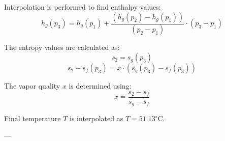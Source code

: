 Interpolation is performed to find enthalpy values:  
\[
h_g(p_3) = h_g(p_1) + \frac{(h_g(p_2) - h_g(p_1))}{(p_2 - p_1)} \cdot (p_3 - p_1)
\]  

The entropy values are calculated as:  
\[
s_2 = s_g(p_3)  
\]  
\[
s_2 - s_f(p_3) = x \cdot (s_g(p_3) - s_f(p_3))
\]  

The vapor quality \( x \) is determined using:  
\[
x = \frac{s_2 - s_f}{s_g - s_f}
\]  

Final temperature \( T \) is interpolated as \( T = 51.13^\circ\text{C} \).  

---